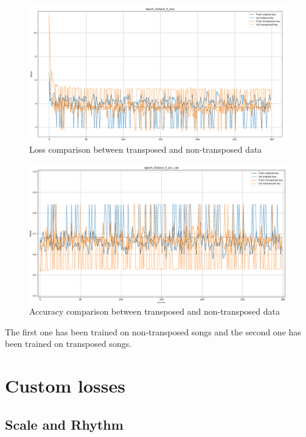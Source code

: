 \documentclass[12pt]{report}
\begin{document}
\begin{figure}[htbp]
    \centering
    \includegraphics[width=\textwidth]{images/experiences/transpose/loss-comparison-transpose.png}
    \caption{Loss comparison between transposed and non-transposed data}
    \label{fig:loss-comparison-transposed}
\end{figure}
\begin{figure}[htbp]
    \centering
    \includegraphics[width=\textwidth]{images/experiences/transpose/acc-comparison-transpose.png}
    \caption{Accuracy comparison between transposed and non-transposed data}
    \label{fig:acc-comparison-transposed}
\end{figure}

The first one has been trained on non-transposed songs and the second one has been trained on transposed songs.

\section{Custom losses}

\subsection{Scale and Rhythm}
\end{document}
